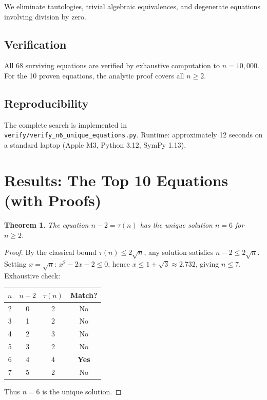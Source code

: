 \documentclass{article}
\newtheorem{theorem}{Theorem}[section]
\begin{document}
We eliminate tautologies, trivial algebraic equivalences, and degenerate equations involving division by zero.

\subsection{Verification}

All 68 surviving equations are verified by exhaustive computation to $n = 10{,}000$. For the 10 proven equations, the analytic proof covers all $n \geq 2$.

\subsection{Reproducibility}

The complete search is implemented in \texttt{verify/verify\_n6\_unique\_equations.py}. Runtime: approximately 12 seconds on a standard laptop (Apple M3, Python 3.12, SymPy 1.13).

\section{Results: The Top 10 Equations (with Proofs)}

\begin{theorem}\label{thm:1}
The equation $n - 2 = \tau(n)$ has the unique solution $n = 6$ for $n \geq 2$.
\end{theorem}

\begin{proof}
By the classical bound $\tau(n) \leq 2\sqrt{n}$, any solution satisfies $n - 2 \leq 2\sqrt{n}$. Setting $x = \sqrt{n}$: $x^2 - 2x - 2 \leq 0$, hence $x \leq 1 + \sqrt{3} \approx 2.732$, giving $n \leq 7$. Exhaustive check:

\begin{center}
\begin{tabular}{cccc}
\toprule
$n$ & $n - 2$ & $\tau(n)$ & Match? \\
\midrule
2 & 0 & 2 & No \\
3 & 1 & 2 & No \\
4 & 2 & 3 & No \\
5 & 3 & 2 & No \\
6 & 4 & 4 & \textbf{Yes} \\
7 & 5 & 2 & No \\
\bottomrule
\end{tabular}
\end{center}
Thus $n = 6$ is the unique solution.
\end{proof}
\end{document}
